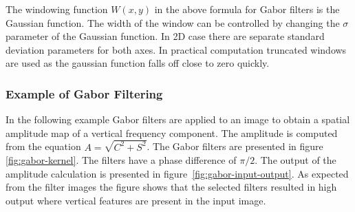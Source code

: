 \documentclass[]{article}
\begin{document}
The windowing function $W(x,y)$ in the above formula for Gabor filters is the
Gaussian function. The width of the window can be controlled by changing the
$\sigma$ parameter of the Gaussian function. In 2D case there are separate
standard deviation parameters for both axes. In practical computation truncated
windows are used as the gaussian function falls off close to zero quickly.

\subsubsection{Example of Gabor Filtering}
\label{example-of-gabor-filtering}
In the following example Gabor filters are applied to an image to obtain a
spatial amplitude map of a vertical frequency component. The amplitude is
computed from the equation $A = \sqrt{C^{2}+S^{2}}$. The Gabor filters are
presented in figure \ref{fig:gabor-kernel}. The filters have a phase difference
of $\pi/2$. The output of the amplitude calculation is presented in
figure~\ref{fig:gabor-input-output}. As expected from the filter images the
figure shows that the selected filters resulted in high output where vertical
features are present in the input image.
\end{document}
